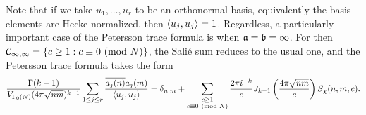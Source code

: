     Note that if we take $u_{1},\ldots,u_{r}$ to be an orthonormal basis, equivalently the basis elements are Hecke normalized, then $\langle u_{j},u_{j}\rangle = 1$. Regardless, a particularly important case of the Petersson trace formula is when $\mathfrak{a} = \mathfrak{b} = \infty$. For then $\mathcal{C}_{\infty,\infty} = \{c \ge 1:c \equiv 0 \ (\mathrm{mod}\text{ }N)\}$, the Sali\'e sum reduces to the usual one, and the Petersson trace formula takes the form
    \[
      \frac{\Gamma(k-1)}{V_{\Gamma_{0}(N)}(4\pi \sqrt{nm})^{k-1}}\sum_{1 \le j \le r}\frac{\overline{a_{j}(n)}a_{j}(m)}{\langle u_{j},u_{j}\rangle} = \delta_{n,m}+\sum_{\substack{c \ge 1 \\ c \equiv 0 \ (\mathrm{mod}\text{ }N)}}\frac{2\pi i^{-k}}{c}J_{k-1}\left(\frac{4\pi\sqrt{nm}}{c}\right)S_{\chi}(n,m,c).
    \]